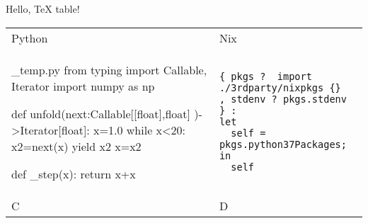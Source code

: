 \documentclass{article}
\newenvironment{pyconcodeblock}%
 {\VerbatimEnvironment
  \begin{VerbatimOut}{_temp.py}}%
 {\end{VerbatimOut}%
  \pyconc{exec(compile(open('_temp.py', 'rb').read(), '_temp.py', 'exec'))}%
  \inputpygments{python}{_temp.py}}
\begin{document}

Hello, TeX table!

\par

\begin{tabular}{|p{}|p{}|}

\hline

Python & Nix

\\

\begin{pyconcodeblock}
from typing import Callable, Iterator
import numpy as np

def unfold(next:Callable[[float],float]
           )->Iterator[float]:
  x=1.0
  while x<20:
    x2=next(x)
    yield x2
    x=x2

def _step(x):
  return x+x
\end{pyconcodeblock}

\begin{pyconsole}
\end{pyconsole}

&

\begin{verbatim}
{ pkgs ?  import ./3rdparty/nixpkgs {}
, stdenv ? pkgs.stdenv
} :
let
  self = pkgs.python37Packages;
in
  self
\end{verbatim}


\\

C

&

D

\\

\hline
\end{tabular}
\end{document}
